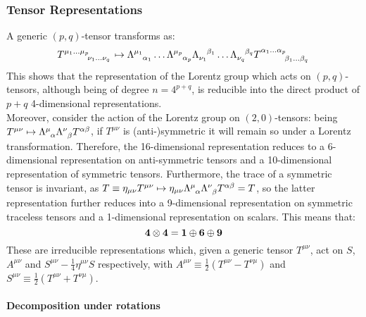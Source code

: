 \subsubsection{Tensor Representations}

A generic $ (p,q) $-tensor transforms as:
\begin{equation}
  \tensor{T}{^{\mu_1 \dots \mu_p}_{\nu_1 \dots \nu_q}} \mapsto \tensor{\Lambda}{^{\mu_1}_{\alpha_1}} \dots \tensor{\Lambda}{^{\mu_p}_{\alpha_p}} \tensor{\Lambda}{_{\nu_1}^{\beta_1}} \dots \tensor{\Lambda}{_{\nu_q}^{\beta_q}} \tensor{T}{^{\alpha_1 \dots \alpha_p}_{\beta_1 \dots \beta_q}}
\end{equation}
This shows that the representation of the Lorentz group which acts on $ (p,q) $-tensors, although being of degree $ n = 4^{p + q} $, is reducible into the direct product of $ p + q $ 4-dimensional representations.\\
Moreover, consider the action of the Lorentz group on $ (2,0) $-tensors: being $ T^{\mu \nu} \mapsto \tensor{\Lambda}{^\mu_\alpha} \tensor{\Lambda}{^\nu_\beta} T^{\alpha \beta} $, if $ T^{\mu \nu} $ is (anti-)symmetric it will remain so under a Lorentz transformation. Therefore, the 16-dimensional representation reduces to a 6-dimensional representation on anti-symmetric tensors and a 10-dimensional representation of symmetric tensors. Furthermore, the trace of a symmetric tensor is invariant, as $ T \equiv \eta_{\mu \nu} T^{\mu \nu} \mapsto \eta_{\mu \nu} \tensor{\Lambda}{^\mu _\alpha} \tensor{\Lambda}{^\nu _\beta} T^{\alpha \beta} = T $, so the latter representation further reduces into a 9-dimensional representation on symmetric traceless tensors and a 1-dimensional representation on scalars. This means that:
\begin{equation}
  \mathbf{4} \otimes \mathbf{4} = \mathbf{1} \oplus \mathbf{6} \oplus \mathbf{9}
  \label{eq:lor-tens-dec}
\end{equation}
These are irreducible representations which, given a generic tensor $ T^{\mu \nu} $, act on $ S $, $ A^{\mu \nu} $ and $ S^{\mu \nu} - \frac{1}{4} \eta^{\mu \nu} S $ respectively, with $ A^{\mu \nu} \equiv \frac{1}{2} \left( T^{\mu \nu} - T^{\nu \mu} \right) $ and $ S^{\mu \nu} \equiv \frac{1}{2} \left( T^{\mu \nu} + T^{\nu \mu} \right) $.

\paragraph{Decomposition under rotations}

